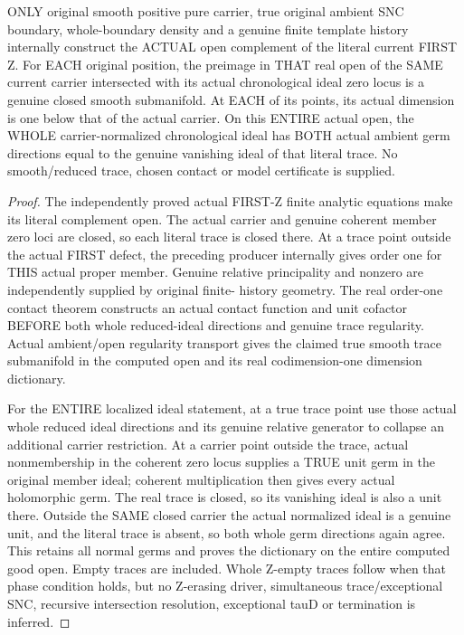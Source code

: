 \begin{theorem}
\label{hir:sharp-actual-first-good-open-whole-reduced-trace-carriers}
\leanok
ONLY original smooth positive pure carrier, true original ambient SNC
boundary, whole-boundary density and a genuine finite template history
internally construct the ACTUAL open complement of the literal current
FIRST Z. For EACH original position, the preimage in THAT real open of
the SAME current carrier intersected with its actual chronological ideal
zero locus is a genuine closed smooth submanifold. At EACH of its points,
its actual dimension is one below that of the actual carrier. On this
ENTIRE actual open, the WHOLE carrier-normalized chronological ideal has
BOTH actual ambient germ directions equal to the genuine vanishing ideal
of that literal trace. No smooth/reduced trace, chosen contact or model
certificate is supplied.
\end{theorem}
\begin{proof}
The independently proved actual FIRST-Z finite analytic equations make
its literal complement open. The actual carrier and genuine coherent
member zero loci are closed, so each literal trace is closed there.
At a trace point outside the actual FIRST defect, the preceding producer
internally gives order one for THIS actual proper member. Genuine relative
principality and nonzero are independently supplied by original finite-
history geometry. The real order-one contact theorem constructs an actual
contact function and unit cofactor BEFORE both whole reduced-ideal
directions and genuine trace regularity. Actual ambient/open regularity
transport gives the claimed true smooth trace submanifold in the computed
open and its real codimension-one dimension dictionary.

For the ENTIRE localized ideal statement, at a true trace point use those
actual whole reduced ideal directions and its genuine relative generator
to collapse an additional carrier restriction. At a carrier point outside
the trace, actual nonmembership in the coherent zero locus supplies a
TRUE unit germ in the original member ideal; coherent multiplication then
gives every actual holomorphic germ. The real trace is closed, so its
vanishing ideal is also a unit there. Outside the SAME closed carrier the
actual normalized ideal is a genuine unit, and the literal trace is absent,
so both whole germ directions again agree. This retains all normal germs
and proves the dictionary on the entire computed good open. Empty traces
are included. Whole Z-empty traces follow when that phase condition holds,
but no Z-erasing driver, simultaneous trace/exceptional SNC, recursive
intersection resolution, exceptional tauD or termination is inferred.
\end{proof}
